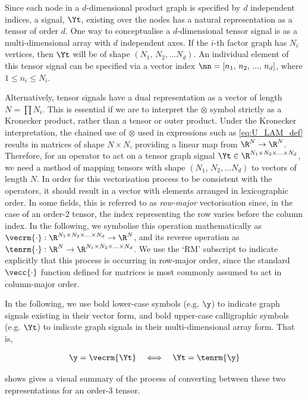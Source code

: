 Since each node in a $d$-dimensional product graph is specified by $d$ independent indices, a signal, $\Yt$, existing over the nodes has a natural representation as a tensor of order $d$. One way to conceptualise a $d$-dimensional tensor signal is as a multi-dimensional array with $d$ independent axes. If the $i$-th factor graph has $N_i$ vertices, then $\Yt$ will be of shape $(N_1, \, N_2 , ... N_d)$. An individual element of this tensor signal can be specified via a vector index $\nn = [n_1,\, n_2,\, ...,\, n_d]$, where $1\leq n_i \leq N_i$.

Alternatively, tensor signals have a dual representation as a vector of length $N = \prod N_i$. This is essential if we are to interpret the $\otimes$ symbol strictly as a Kronecker product, rather than a tensor or outer product. Under the Kronecker interpretation, the chained use of $\otimes$ used in expressions such as \cref{eq:U_LAM_def} results in matrices of shape $N \times N$, providing a linear map from $\R^{N} \rightarrow \R^{N}$. Therefore, for an operator to act on a tensor graph signal $\Yt \in \R^{N_1 \times N_2 \times ... \times N_d}$, we need a method of mapping tensors with shape $(N_1, \, N_2 , ... N_d)$ to vectors of length $N$. In order for this vectorisation process to be consistent with the operators, it should result in a vector with elements arranged in lexicographic order. In some fields, this is referred to as \textit{row-major} vectorisation since, in the case of an order-2 tensor, the index representing the row varies before the column index. In the following, we symbolise this operation mathematically as $\vecrm{\cdot}: \R^{N_1 \times N_2 \times ... \times N_d} \rightarrow \R^N$, and its reverse operation as $\tenrm{\cdot}: \R^N \rightarrow \R^{N_1 \times N_2 \times ... \times N_d}$. We use the `RM' subscript to indicate explicitly that this process is occurring in row-major order, since the standard $\vecc{\cdot}$ function defined for matrices is most commonly assumed to act in column-major order.  

In the following, we use bold lower-case symbols (e.g. $\y$) to indicate graph signals existing in their vector form, and bold upper-case calligraphic symbols (e.g. $\Yt$) to indicate graph signals in their multi-dimensional array form. That is, 

\begin{align*}
    \y = \vecrm{\Yt} \quad \Longleftrightarrow \quad \Yt  = \tenrm{\y}
\end{align*}

 shows gives a visual summary of the process of converting between these two representations for an order-3 tensor. 


